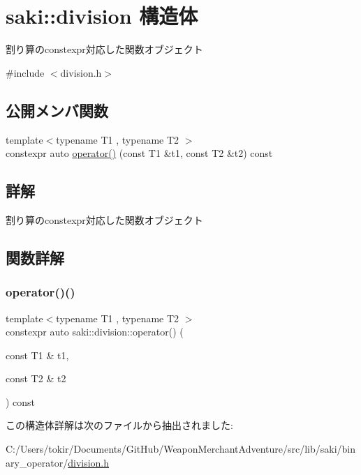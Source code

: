 \hypertarget{structsaki_1_1division}{}\section{saki\+:\+:division 構造体}
\label{structsaki_1_1division}


割り算のconstexpr対応した関数オブジェクト  




{\ttfamily \#include $<$division.\+h$>$}

\subsection*{公開メンバ関数}
\begin{DoxyCompactItemize}
\item 
{\footnotesize template$<$typename T1 , typename T2 $>$ }\\constexpr auto \mbox{\hyperlink{structsaki_1_1division_a4ded7d15a028cf98a5c5f72cf33ddba0}{operator()}} (const T1 \&t1, const T2 \&t2) const
\end{DoxyCompactItemize}


\subsection{詳解}
割り算のconstexpr対応した関数オブジェクト 

\subsection{関数詳解}
\mbox{\label{structsaki_1_1division_a4ded7d15a028cf98a5c5f72cf33ddba0}} 
\subsubsection{\texorpdfstring{operator()()}{operator()()}}
{\footnotesize\ttfamily template$<$typename T1 , typename T2 $>$ \\
constexpr auto saki\+::division\+::operator() (\begin{DoxyParamCaption}\item[{const T1 \&}]{t1,  }\item[{const T2 \&}]{t2 }\end{DoxyParamCaption}) const\hspace{0.3cm}{\ttfamily [inline]}}



この構造体詳解は次のファイルから抽出されました\+:\begin{DoxyCompactItemize}
\item 
C\+:/\+Users/tokir/\+Documents/\+Git\+Hub/\+Weapon\+Merchant\+Adventure/src/lib/saki/binary\+\_\+operator/\mbox{\hyperlink{division_8h}{division.\+h}}\end{DoxyCompactItemize}
